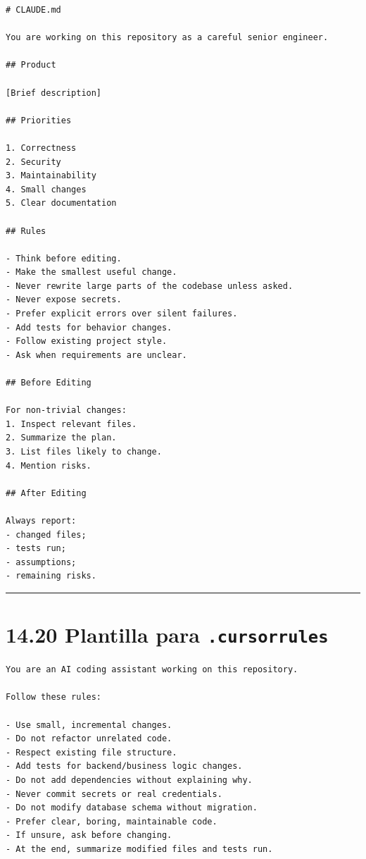 \begin{lstlisting}
# CLAUDE.md

You are working on this repository as a careful senior engineer.

## Product

[Brief description]

## Priorities

1. Correctness
2. Security
3. Maintainability
4. Small changes
5. Clear documentation

## Rules

- Think before editing.
- Make the smallest useful change.
- Never rewrite large parts of the codebase unless asked.
- Never expose secrets.
- Prefer explicit errors over silent failures.
- Add tests for behavior changes.
- Follow existing project style.
- Ask when requirements are unclear.

## Before Editing

For non-trivial changes:
1. Inspect relevant files.
2. Summarize the plan.
3. List files likely to change.
4. Mention risks.

## After Editing

Always report:
- changed files;
- tests run;
- assumptions;
- remaining risks.
\end{lstlisting}

\begin{center}\rule{0.5\linewidth}{0.5pt}\end{center}

\section{\texorpdfstring{14.20 Plantilla para
\texttt{.cursorrules}}{14.20 Plantilla para .cursorrules}}\label{plantilla-para-.cursorrules}

\begin{lstlisting}
You are an AI coding assistant working on this repository.

Follow these rules:

- Use small, incremental changes.
- Do not refactor unrelated code.
- Respect existing file structure.
- Add tests for backend/business logic changes.
- Do not add dependencies without explaining why.
- Never commit secrets or real credentials.
- Do not modify database schema without migration.
- Prefer clear, boring, maintainable code.
- If unsure, ask before changing.
- At the end, summarize modified files and tests run.
\end{lstlisting}


